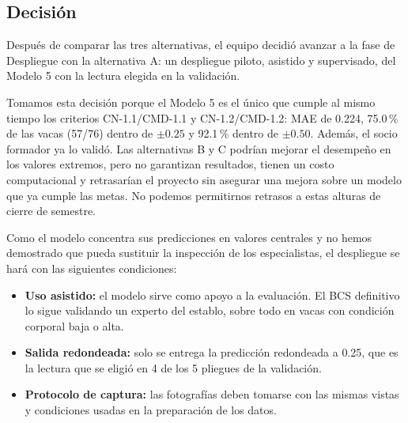 \subsection{Decisión}

Después de comparar las tres alternativas, el equipo decidió avanzar a la fase de Despliegue con la alternativa A: un despliegue piloto, asistido y supervisado, del Modelo 5 con la lectura elegida en la validación.

Tomamos esta decisión porque el Modelo 5 es el único que cumple al mismo tiempo los criterios CN-1.1/CMD-1.1 y CN-1.2/CMD-1.2: MAE de 0.224, 75.0\,\% de las vacas (57/76) dentro de $\pm0.25$ y 92.1\,\% dentro de $\pm0.50$. Además, el socio formador ya lo validó. Las alternativas B y C podrían mejorar el desempeño en los valores extremos, pero no garantizan resultados, tienen un costo computacional y retrasarían el proyecto sin asegurar una mejora sobre un modelo que ya cumple las metas. No podemos permitirnos retrasos a estas alturas de cierre de semestre.

Como el modelo concentra sus predicciones en valores centrales y no hemos demostrado que pueda sustituir la inspección de los especialistas, el despliegue se hará con las siguientes condiciones:

\begin{itemize}
  \item \textbf{Uso asistido:} el modelo sirve como apoyo a la evaluación. El BCS definitivo lo sigue validando un experto del establo, sobre todo en vacas con condición corporal baja o alta.
  \item \textbf{Salida redondeada:} solo se entrega la predicción redondeada a 0.25, que es la lectura que se eligió en 4 de los 5 pliegues de la validación.
  \item \textbf{Protocolo de captura:} las fotografías deben tomarse con las mismas vistas y condiciones usadas en la preparación de los datos.
\end{itemize}
